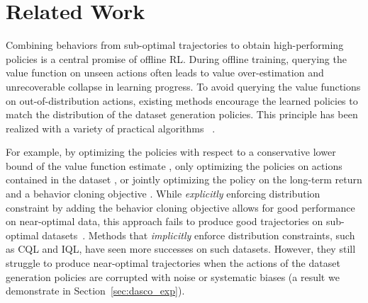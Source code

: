 \section{Related Work}

Combining behaviors from sub-optimal trajectories to obtain high-performing policies is a central promise of offline RL. During offline training, querying the value function on unseen actions often leads to value over-estimation and unrecoverable collapse in learning progress. To avoid querying the value functions on out-of-distribution actions, existing methods encourage the learned policies to match the distribution of the dataset generation policies. This principle has been realized with a variety of practical algorithms ~\cite{jaques2019way,brac,peng2019awr,siegel2020keep,brac,kumar2019stabilizing, kostrikov2021offline,kostrikov2021offlineb,wang2020critic,fujimoto2021minimalist, BAIL, furuta2022generalized, jang2022gptcritic, meng2022offline, daoudi2022density, liu2022robust}.

For example, by optimizing the policies with respect to a conservative lower bound of the value function estimate \cite{kumar2020conservative}, only optimizing the policies on actions contained in the dataset \cite{kostrikov2021offline}, or jointly optimizing the policy on the long-term return and a behavior cloning objective \cite{fujimoto2021minimalist}. While \textit{explicitly} enforcing distribution constraint by adding the behavior cloning objective allows for good performance on near-optimal data, 
this approach fails to produce good trajectories on sub-optimal datasets~\cite{kostrikov2021offline}.
Methods that \textit{implicitly} enforce distribution constraints, such as CQL and IQL, have seen more successes on such datasets.
However, they still struggle to produce near-optimal trajectories when the actions of the dataset generation policies are corrupted with noise or systematic biases (a result we demonstrate in Section~\ref{sec:dasco_exp}).

